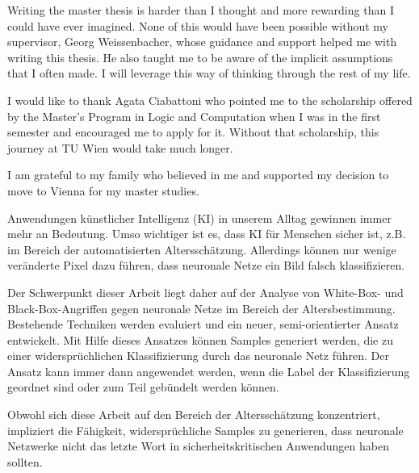 \documentclass[draft,final]{vutinfth} %
\begin{document}
\frontmatter %

\addstatementpage

\begin{acknowledgements*}
Writing the master thesis is harder than I thought and more rewarding than I could have ever imagined. None of this would have been possible without my supervisor, Georg Weissenbacher, whose guidance and support helped me with writing this thesis. He also taught me to be aware of the implicit assumptions that I often made. I will leverage this way of thinking through the rest of my life. 

I would like to thank Agata Ciabattoni who pointed me to the scholarship offered by the Master’s Program in Logic and Computation when I was in the first semester and encouraged me to apply for it. Without that scholarship, this journey at TU Wien would take much longer.

I am grateful to my family who believed in me and supported my decision to move to Vienna for my master studies.
\end{acknowledgements*}

\begin{kurzfassung}
Anwendungen künstlicher Intelligenz (KI) in unserem Alltag gewinnen immer mehr an Bedeutung. Umso wichtiger ist es, dass KI für Menschen sicher ist, z.B. im Bereich der automatisierten Altersschätzung. Allerdings können nur wenige veränderte Pixel dazu führen, dass neuronale Netze ein Bild falsch klassifizieren. 

Der Schwerpunkt dieser Arbeit liegt daher auf der Analyse von White-Box- und Black-Box-Angriffen gegen neuronale Netze im Bereich der Altersbestimmung. Bestehende Techniken werden evaluiert und ein neuer, semi-orientierter Ansatz entwickelt. Mit Hilfe dieses Ansatzes können Samples generiert werden, die zu einer widersprüchlichen Klassifizierung durch das neuronale Netz führen. Der Ansatz kann immer dann angewendet werden, wenn die Label der Klassifizierung geordnet sind oder zum Teil gebündelt werden können.  

Obwohl sich diese Arbeit auf den Bereich der Altersschätzung konzentriert, impliziert die Fähigkeit, widersprüchliche Samples zu generieren, dass neuronale Netzwerke nicht das letzte Wort in sicherheitskritischen Anwendungen haben sollten.
\end{kurzfassung}
\end{document}
